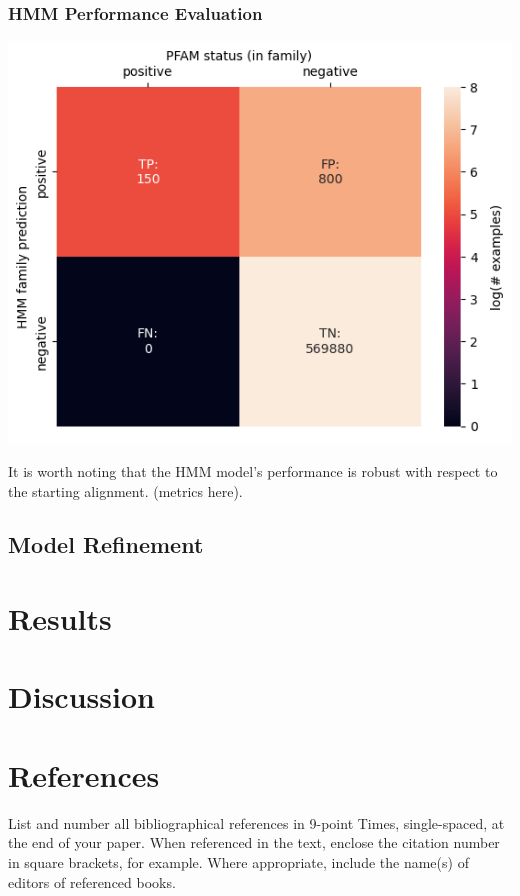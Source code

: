 \documentclass[10pt,twocolumn,letterpaper]{article}
\begin{document}
\subsubsection{HMM Performance Evaluation}

\begin{center}
    \includegraphics[scale=0.4]{img/hmm_eval.png}
\end{center}

It is worth noting that the HMM model's performance is robust with respect to the starting alignment. (metrics here).\\

\subsection{Model Refinement}






\section{Results}

\section{Discussion}




\section{References}

List and number all bibliographical references in 9-point Times,
single-spaced, at the end of your paper. When referenced in the text,
enclose the citation number in square brackets, for
example.  Where appropriate, include the name(s) of
editors of referenced books.

%
%
\end{document}
